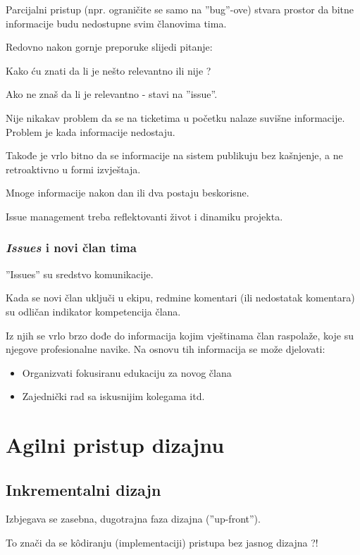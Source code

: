 \documentclass[lmodern, utf8, zavrsni]{fit}
\begin{document}
Parcijalni pristup (npr. ograničite se samo na ''bug''-ove) stvara prostor da bitne informacije budu nedostupne svim članovima tima.

Redovno nakon gornje preporuke slijedi pitanje:

Kako ću znati da li je nešto relevantno  ili nije ?

Ako ne znaš da li je relevantno - stavi na ''issue''. 

Nije nikakav problem da se na ticketima u početku nalaze suvišne informacije. Problem je kada informacije nedostaju.

Takođe je vrlo bitno da se informacije na sistem publikuju bez kašnjenje, a ne retroaktivno u formi izvještaja.

Mnoge informacije nakon dan ili dva postaju beskorisne.

Issue management treba reflektovanti život i dinamiku projekta.

\subsection{\emph{Issues} i novi član tima}

''Issues'' su sredstvo komunikacije.

Kada se novi član uključi u ekipu, redmine komentari (ili nedostatak komentara) su odličan indikator kompetencija člana.

Iz njih se vrlo brzo dođe do informacija kojim vještinama član raspolaže, koje su njegove profesionalne navike. Na osnovu tih informacija se može djelovati: 
\begin{itemize}
  \item Organizvati fokusiranu edukaciju za novog člana
  \item Zajednički rad sa iskusnijim kolegama itd.
\end{itemize}

\chapter{Agilni pristup dizajnu}

\section{Inkrementalni dizajn}

Izbjegava se zasebna, dugotrajna faza dizajna (''up-front''). 

To znači da se k\^odiranju (implementaciji) pristupa bez jasnog dizajna ?!
\end{document}
